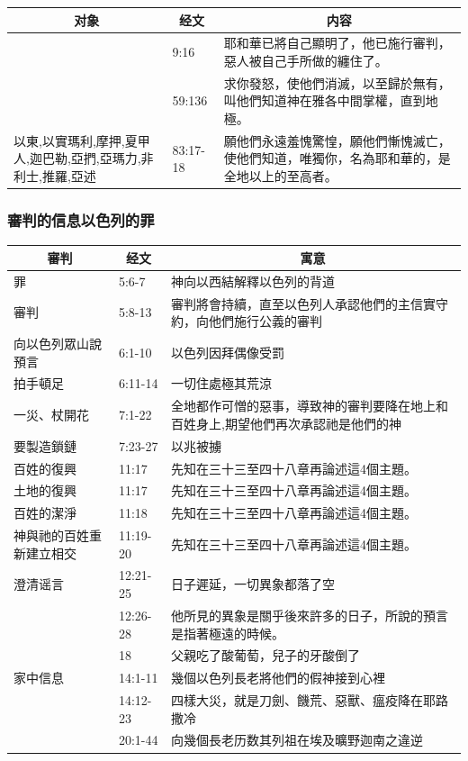 \begin{table}[H]
\centering
\begin{tabular}{p{5.5cm}|p{}|p{9.50cm}}\hline\hline
\multicolumn{1}{c|}{对象}&\multicolumn{1}{c|}{经文}&\multicolumn{1}{c}{内容}\\\hline
&9:16&耶和華已將自己顯明了，他已施行審判，惡人被自己手所做的纏住了。\\\hline
&59:136&求你發怒，使他們消滅，以至歸於無有，叫他們知道神在雅各中間掌權，直到地極。\\\hline 
以東,以實瑪利,摩押,夏甲人,迦巴勒,亞捫,亞瑪力,非利士,推羅,亞述&83:17-18&願他們永遠羞愧驚惶，願他們慚愧滅亡，使他們知道，唯獨你，名為耶和華的，是全地以上的至高者。\\\hline 

\end{tabular}
\end{table}



 
\subsubsection{審判的信息以色列的罪}
\begin{table}[H]
\centering
\begin{tabular}{p{3.75cm}|p{2.0cm}|p{11.0cm}}\hline\hline
\multicolumn{1}{c|}{審判}&\multicolumn{1}{c|}{经文}&\multicolumn{1}{c}{寓意}\\\hline
罪&5:6-7&神向以西結解釋以色列的背道\\\hline 
審判&5:8-13&審判將會持續，直至以色列人承認他們的主信實守約，向他們施行公義的審判\\\hline 
向以色列眾山說預言&6:1-10&以色列因拜偶像受罰\\\hline 
拍手頓足&6:11-14&一切住處極其荒涼\\\hline
一災、杖開花&7:1-22&全地都作可憎的惡事，導致神的審判要降在地上和百姓身上,期望他們再次承認祂是他們的神\\\hline 
要製造鎖鏈&7:23-27&以兆被擄\\\hline 
百姓的復興&11:17&先知在三十三至四十八章再論述這4個主題。\\\hline 
土地的復興&11:17&先知在三十三至四十八章再論述這4個主題。\\\hline 
百姓的潔淨&11:18&先知在三十三至四十八章再論述這4個主題。\\\hline 
神與祂的百姓重新建立相交&11:19-20&先知在三十三至四十八章再論述這4個主題。\\\hline 
澄清谣言&12:21-25&日子遲延，一切異象都落了空\\\hline 
&12:26-28&他所見的異象是關乎後來許多的日子，所說的預言是指著極遠的時候。\\\hline 
&18&父親吃了酸葡萄，兒子的牙酸倒了\\\hline 
家中信息&14:1-11&幾個以色列長老將他們的假神接到心裡\\\hline 
&14:12-23&四樣大災，就是刀劍、饑荒、惡獸、瘟疫降在耶路撒冷\\\hline 
&20:1-44&向幾個長老历数其列祖在埃及曠野迦南之違逆\\\hline 
\end{tabular}
\end{table}


